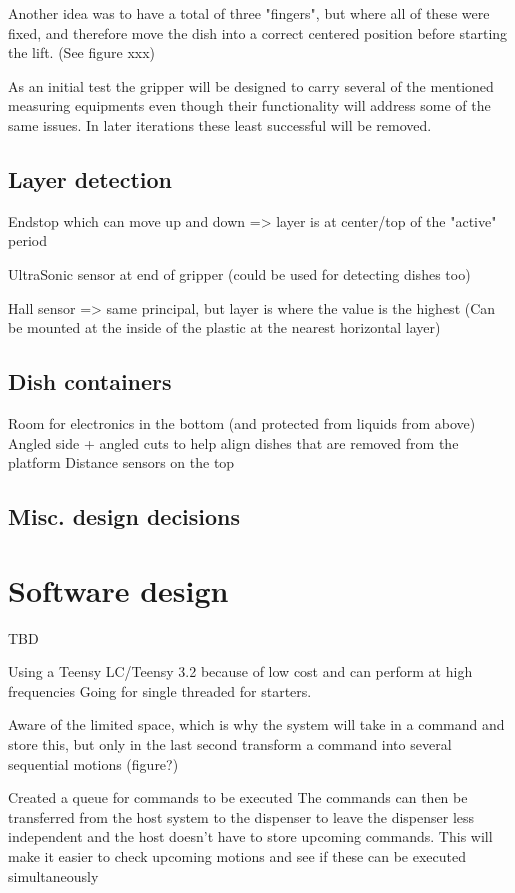 \documentclass{sigchi}
\begin{document}
		Another idea was to have a total of three "fingers", but where all of these were fixed, and therefore move the dish into a correct centered position before starting the lift. (See figure xxx)
		
		
		
		As an initial test the gripper will be designed to carry several of the mentioned measuring equipments even though their functionality will address some of the same issues. In later iterations these least successful will be removed.
		
	
	\subsection{Layer detection}
		Endstop which can move up and down => layer is at center/top of the "active" period
		
		UltraSonic sensor at end of gripper (could be used for detecting dishes too)
		
		Hall sensor => same principal, but layer is where the value is the highest
			(Can be mounted at the inside of the plastic at the nearest horizontal layer)
	
			
			
	\subsection{Dish containers}	
		Room for electronics in the bottom (and protected from liquids from above)
		Angled side + angled cuts to help align dishes that are removed from the platform
		Distance sensors on the top
	
	
	\subsection{Misc. design decisions}
	
	\section{Software design}
	TBD
	
	Using a Teensy LC/Teensy 3.2 because of low cost and can perform at high frequencies
	Going for single threaded for starters.
	
	Aware of the limited space, which is why the system will take in a command and store this, but only in the last second transform a command into several sequential motions (figure?)
	
	
	
	
	Created a queue for commands to be executed
		The commands can then be transferred from the host system to the dispenser to leave the dispenser less independent and the host doesn't have to store upcoming commands.
		This will make it easier to check upcoming motions and see if these can be executed simultaneously
\end{document}
